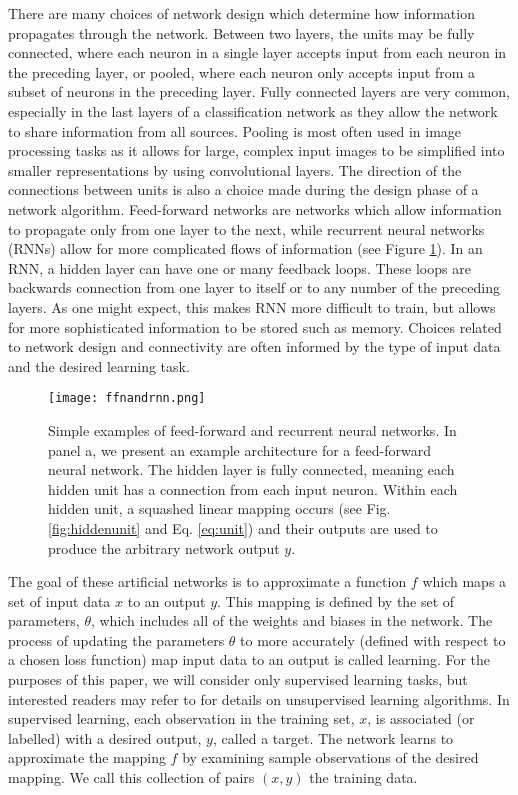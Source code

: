 \documentclass[12pt]{article}
\begin{document}
\indent There are many choices of network design which determine how information propagates through the network. Between two layers, the units may be fully connected, where each neuron in a single layer accepts input from each neuron in the preceding layer, or pooled, where each neuron only accepts input from a subset of neurons in the preceding layer. Fully connected layers are very common, especially in the last layers of a classification network as they allow the network to share information from all sources. Pooling is most often used in image processing tasks as it allows for large, complex input images to be simplified into smaller representations by using convolutional layers. The direction of the connections between units is also a choice made during the design phase of a network algorithm. Feed-forward networks are networks which allow information to propagate only from one layer to the next, while recurrent neural networks (RNNs) allow for more complicated flows of information (see Figure \ref{fig:ffnandrnn}). In an RNN, a hidden layer can have one or many feedback loops. These loops are backwards connection from one layer to itself or to any number of the preceding layers. As one might expect, this makes RNN more difficult to train, but allows for more sophisticated information to be stored such as memory. Choices related to network design and connectivity are often informed by the type of input data and the desired learning task.  \\
\begin{figure}
  \centering
  \texttt{[image: ffnandrnn.png]}
  \caption{Simple examples of feed-forward and recurrent neural networks. In panel a, we present an example architecture for a feed-forward neural network. The hidden layer is fully connected, meaning each hidden unit has a connection from each input neuron. Within each hidden unit, a squashed linear mapping occurs (see Fig. \ref{fig:hiddenunit} and Eq. \ref{eq:unit}) and their outputs are used to produce the arbitrary network output $y$.}
  \label{fig:ffnandrnn}
\end{figure}
\indent The goal of these artificial networks is to approximate a function $f$ which maps a set of input data $x$ to an output $y$. This mapping is defined by the set of parameters, $\theta$, which includes all of the weights and biases in the network. The process of updating the parameters $\theta$ to more accurately (defined with respect to a chosen loss function) map input data to an output is called learning. For the purposes of this paper, we will consider only supervised learning tasks, but interested readers may refer to \cite{bengio} for details on unsupervised learning algorithms. In supervised learning, each observation in the training set, $x$, is associated (or labelled) with a desired output, $y$, called a target. The network learns to approximate the mapping $f$ by examining sample observations of the desired mapping. We call this collection of pairs $(x,y)$ the training data. \\
\end{document}
